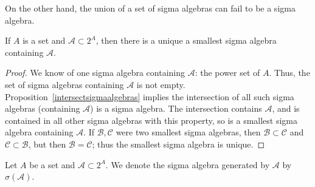 On the other hand, the union of a set
of sigma algebras can fail to be a
sigma algebra.

\begin{prop}
  If $A$ is a set and
  $\mathcal{A} \subset 2^A$,
  then
  there is a unique a smallest sigma algebra
  containing $\mathcal{A}$.

  \begin{proof}
    We know of one sigma algebra containing $\mathcal{A}$:
    the power set of $A$.
    Thus, the set of sigma algebras containing
    $\mathcal{A}$ is not empty.
    Proposition~\ref{intersectsigmaalgebras}
    implies
    the intersection of all
    such sigma algebras
    (containing $\mathcal{A}$) is a sigma algebra.
    The intersection contains $\mathcal{A}$,
    and is contained in all other sigma algebras
    with this property, so is a smallest sigma
    algebra containing $\mathcal{A}$.
    If $\mathcal{B}, \mathcal{C}$ were two smallest
    sigma algebras, then $\mathcal{B} \subset \mathcal{C}$
    and $\mathcal{C} \subset \mathcal{B}$, but then
    $\mathcal{B} = \mathcal{C}$; thus the smallest
    sigma algebra is unique.
  \end{proof}
\end{prop}


Let $A$ be a set and
$\mathcal{A} \subset 2^A$.
We denote the sigma algebra
generated by $\mathcal{A}$
by $\sigma(\mathcal{A})$.
\strats
